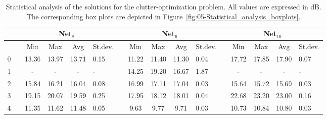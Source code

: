 \begin{table}
\centering

\caption{Statistical analysis of the solutions for the clutter-optimization
problem. All values are expressed in dB. The corresponding box plots
are depicted in Figure~\ref{fig:05-Statistical_analysis_boxplots}.
\label{tab:05-Statistical_analysis_of_solutions}}


{\scriptsize{}}%
\begin{tabular}{>{\centering}p{0.2cm}cccc>{\centering}p{0.75cm}cccc>{\centering}p{0.75cm}cccc>{\centering}p{0.75cm}}
\cline{3-16} 
 &  &  & \multicolumn{2}{c}{{\scriptsize{Net$_{8}$}}} &  &  &  & \multicolumn{2}{c}{{\scriptsize{Net$_{9}$}}} &  &  &  & \multicolumn{2}{c}{{\scriptsize{Net$_{10}$}}} & \tabularnewline
\hline 
{\scriptsize{Cat.}} &  & {\scriptsize{Min}} & {\scriptsize{Max}} & {\scriptsize{Avg}} & {\scriptsize{St.dev.}} &  & {\scriptsize{Min}} & {\scriptsize{Max}} & {\scriptsize{Avg}} & {\scriptsize{St.dev.}} &  & {\scriptsize{Min}} & {\scriptsize{Max}} & {\scriptsize{Avg}} & {\scriptsize{St.dev.}}\tabularnewline
\hline 
{\scriptsize{0}} &  & {\scriptsize{13.36}} & {\scriptsize{13.97}} & {\scriptsize{13.71}} & {\scriptsize{0.15}} &  & {\scriptsize{11.22}} & {\scriptsize{11.40}} & {\scriptsize{11.30}} & {\scriptsize{0.04}} &  & {\scriptsize{17.72}} & {\scriptsize{17.85}} & {\scriptsize{17.90}} & {\scriptsize{0.07}}\tabularnewline
\cline{1-6} \cline{8-11} \cline{13-16} 
{\scriptsize{1}} &  & {\scriptsize{-}} & {\scriptsize{-}} & {\scriptsize{-}} & {\scriptsize{-}} &  & {\scriptsize{14.25}} & {\scriptsize{19.20}} & {\scriptsize{16.67}} & {\scriptsize{1.87}} &  & {\scriptsize{-}} & {\scriptsize{-}} & {\scriptsize{-}} & {\scriptsize{-}}\tabularnewline
\cline{1-6} \cline{8-11} \cline{13-16} 
{\scriptsize{2}} &  & {\scriptsize{15.84}} & {\scriptsize{16.21}} & {\scriptsize{16.04}} & {\scriptsize{0.08}} &  & {\scriptsize{16.99}} & {\scriptsize{17.11}} & {\scriptsize{17.04}} & {\scriptsize{0.03}} &  & {\scriptsize{15.64}} & {\scriptsize{15.72}} & {\scriptsize{15.69}} & {\scriptsize{0.03}}\tabularnewline
\cline{1-6} \cline{8-11} \cline{13-16} 
{\scriptsize{3}} &  & {\scriptsize{19.15}} & {\scriptsize{20.07}} & {\scriptsize{19.59}} & {\scriptsize{0.25}} &  & {\scriptsize{17.95}} & {\scriptsize{18.12}} & {\scriptsize{18.01}} & {\scriptsize{0.04}} &  & {\scriptsize{22.68}} & {\scriptsize{23.20}} & {\scriptsize{23.00}} & {\scriptsize{0.16}}\tabularnewline
\cline{1-6} \cline{8-11} \cline{13-16} 
{\scriptsize{4}} &  & {\scriptsize{11.35}} & {\scriptsize{11.62}} & {\scriptsize{11.48}} & {\scriptsize{0.05}} &  & {\scriptsize{9.63}} & {\scriptsize{9.77}} & {\scriptsize{9.71}} & {\scriptsize{0.03}} &  & {\scriptsize{10.73}} & {\scriptsize{10.84}} & {\scriptsize{10.80}} & {\scriptsize{0.03}}\tabularnewline

\end{tabular}
\end{table}
